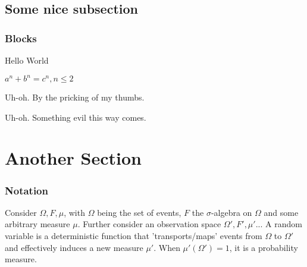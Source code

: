\documentclass{beamer}
\begin{document}
\subsection{Some nice subsection}
\begin{frame}
\frametitle{Blocks}
\begin{definition}[Greetings]
Hello World
\end{definition}

\begin{theorem}
$a^n + b^n = c^n, n \leq 2$
\end{theorem}

\begin{alertblock}{Uh-oh.}
By the pricking of my thumbs.
\end{alertblock}

\begin{exampleblock}{Uh-oh.}
Something evil this way comes.
\end{exampleblock}

\end{frame}


\section{Another Section} %
\label{sec:another_section}

\begin{frame}
	\frametitle{Notation}
	\begin{definition}
		Consider $\Omega, F, \mu$, with $\Omega$ being the set of events, $F$ the $\sigma$-algebra on $\Omega$ and some arbitrary measure $\mu$. Further consider an observation space $\Omega', F', \mu'$... A random variable is a deterministic function that 'transports/maps' events from $\Omega$ to $\Omega'$ and effectively induces a new measure $\mu'$. When $\mu'(\Omega') = 1$, it is a probability measure.

	\end{definition}
\end{frame}




\end{document}
